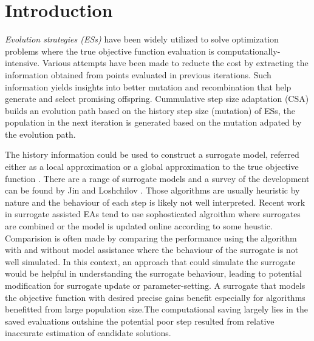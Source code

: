 \section{Introduction}


\textit{Evolution strategies (ESs)} have been widely utilized to solve optimization problems where the true objective function evaluation is computationally-intensive. Various attempts have been made to reducte the cost by extracting the information obtained from points evaluated in previous iterations. Such information yields insights into better mutation and recombination that help generate and select promising offspring. Cummulative step size adaptation (CSA) \cite{Ostermeier:1994:DAS:1326675.1326679} builds an evolution path based on the history step size (mutation) of ESs, the population in the next iteration is generated based on the mutation adpated by the evolution path. 

The history information could be used to construct a surrogate model, referred either as a local approximation or a global approximation to the true objective function \cite{Jin:2002:FAE:2955491.2955686}. There are a range of surrogate models and a survey of the development can be found by Jin \cite{JIN201161} and Loshchilov \cite{ECJ2016_LMCMA}. Those algorithms are usually heuristic by nature and the behaviour of each step is likely not well interpreted. Recent work in surrogate assisted EAs tend to use sophosticated algroithm where surrogates are combined or the model is updated online according to some heustic. Comparision is often made by comparing the performance using the algorithm with and without model assistance where the behaviour of the surrogate is not well simulated. In this context, an approach that could simulate the surrogate would be helpful in understanding the surrogate behaviour, leading to potential modification for surrogate update or parameter-setting. A surrogate that models the objective function with desired precise gains benefit especially for algorithms benefitted from large population size.The computational saving largely lies in the saved evaluations outshine the potential poor step resulted from relative inaccurate estimation of candidate solutions. 


